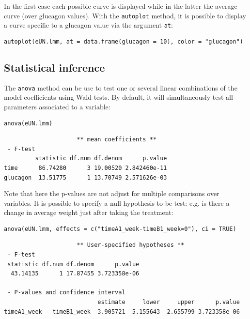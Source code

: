 \documentclass[12pt]{article}
\begin{document}
In the first case each possible curve is displayed while in the latter
the average curve (over glucagon values). With the \texttt{autoplot} method,
it is possible to display a curve specific to a glucagon value via the
argument \texttt{at}:
\lstset{language=r,label= ,caption= ,captionpos=b,numbers=none}
\begin{lstlisting}
autoplot(eUN.lmm, at = data.frame(glucagon = 10), color = "glucagon")
\end{lstlisting}

\subsection{Statistical inference}
\label{sec:org45e682c}

The \texttt{anova} method can be use to test one or several linear
combinations of the model coefficients using Wald tests. By default,
it will simultaneously test all parameters associated to a variable:
\lstset{language=r,label= ,caption= ,captionpos=b,numbers=none}
\begin{lstlisting}
anova(eUN.lmm)
\end{lstlisting}

\begin{verbatim}
                     ** mean coefficients ** 
 - F-test
         statistic df.num df.denom      p.value
time      86.74280      3 19.00520 2.842460e-11
glucagon  13.51775      1 13.70749 2.571626e-03
\end{verbatim}


Note that here the p-values are not adjust for multiple comparisons
over variables. It is possible to specify a null hypothesis to be
test: e.g. is there a change in average weight just after taking the
treatment:
\lstset{language=r,label= ,caption= ,captionpos=b,numbers=none}
\begin{lstlisting}
anova(eUN.lmm, effects = c("timeA1_week-timeB1_week=0"), ci = TRUE)
\end{lstlisting}

\begin{verbatim}
                     ** User-specified hypotheses ** 
 - F-test
 statistic df.num df.denom      p.value
  43.14135      1 17.87455 3.723358e-06

 - P-values and confidence interval 
                           estimate     lower     upper      p.value
timeA1_week - timeB1_week -3.905721 -5.155643 -2.655799 3.723358e-06
\end{verbatim}
\end{document}
